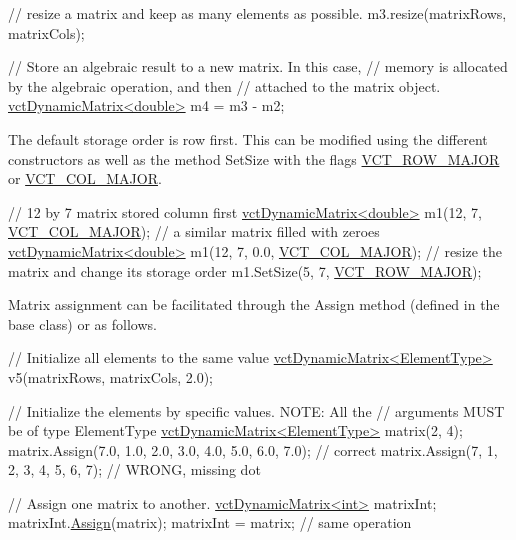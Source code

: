 \begin{DoxyEnumerate}
\begin{DoxyCode}
\textcolor{comment}{// resize a matrix and keep as many elements as possible.}
m3.resize(matrixRows, matrixCols);

\textcolor{comment}{// Store an algebraic result to a new matrix.  In this case,}
\textcolor{comment}{// memory is allocated by the algebraic operation, and then}
\textcolor{comment}{// attached to the matrix object.}
\hyperlink{classvct_dynamic_matrix}{vctDynamicMatrix<double>} m4 = m3 - m2;
\end{DoxyCode}
 
\item The default storage order is row first. This can be modified using the different constructors as well as the method Set\-Size with the flags \hyperlink{vct_forward_declarations_8h_a45ba752f741240bf765417ebc8130d62}{V\-C\-T\-\_\-\-R\-O\-W\-\_\-\-M\-A\-J\-O\-R} or \hyperlink{vct_forward_declarations_8h_a432cdf8923afaf82f551450ad4034746}{V\-C\-T\-\_\-\-C\-O\-L\-\_\-\-M\-A\-J\-O\-R}. 
\begin{DoxyCode}
\textcolor{comment}{// 12 by 7 matrix stored column first}
\hyperlink{classvct_dynamic_matrix}{vctDynamicMatrix<double>} m1(12, 7, \hyperlink{vct_forward_declarations_8h_a432cdf8923afaf82f551450ad4034746}{VCT\_COL\_MAJOR});
\textcolor{comment}{// a similar matrix filled with zeroes}
\hyperlink{classvct_dynamic_matrix}{vctDynamicMatrix<double>} m1(12, 7, 0.0, \hyperlink{vct_forward_declarations_8h_a432cdf8923afaf82f551450ad4034746}{VCT\_COL\_MAJOR});
\textcolor{comment}{// resize the matrix and change its storage order}
m1.SetSize(5, 7, \hyperlink{vct_forward_declarations_8h_a45ba752f741240bf765417ebc8130d62}{VCT\_ROW\_MAJOR});
\end{DoxyCode}
 
\item Matrix assignment can be facilitated through the Assign method (defined in the base class) or as follows. 
\begin{DoxyCode}
\textcolor{comment}{// Initialize all elements to the same value}
\hyperlink{classvct_dynamic_matrix}{vctDynamicMatrix<ElementType>} v5(matrixRows, matrixCols, 2.0);

\textcolor{comment}{// Initialize the elements by specific values.  NOTE: All the}
\textcolor{comment}{// arguments MUST be of type ElementType}
\hyperlink{classvct_dynamic_matrix}{vctDynamicMatrix<ElementType>} matrix(2, 4);
matrix.Assign(7.0, 1.0, 2.0, 3.0,
              4.0, 5.0, 6.0, 7.0); \textcolor{comment}{// correct}
matrix.Assign(7, 1, 2, 3,
              4, 5, 6, 7); \textcolor{comment}{// WRONG, missing dot}

\textcolor{comment}{// Assign one matrix to another.}
\hyperlink{classvct_dynamic_matrix}{vctDynamicMatrix<int>} matrixInt;
matrixInt.\hyperlink{classvct_dynamic_matrix_base_a2f080a67dc52e906f0219bbc924febbc}{Assign}(matrix);
matrixInt = matrix; \textcolor{comment}{// same operation}
\end{DoxyCode}
 
\end{DoxyEnumerate}


